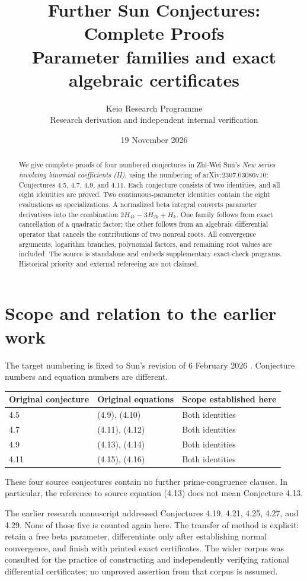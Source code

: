 \documentclass[11pt,a4paper]{article}
\title{Further Sun Conjectures: Complete Proofs\\[5pt]
\large Parameter families and exact algebraic certificates}
\author{Keio Research Programme\\Research derivation and independent internal verification}
\date{19 November 2026}
\theoremstyle{remark}\newtheorem{remark}[theorem]{Remark}
\numberwithin{equation}{section}
\begin{document}
\maketitle
\begin{abstract}
We give complete proofs of four numbered conjectures in Zhi-Wei Sun's
\emph{New series involving binomial coefficients (II)}, using the numbering
of arXiv:2307.03086v10: Conjectures 4.5, 4.7, 4.9, and 4.11.
Each conjecture consists of two identities, and all eight identities are
proved. Two continuous-parameter identities contain the eight evaluations
as specializations. A normalized beta integral converts parameter
derivatives into the combination $2H_{4k}-3H_{2k}+H_k$.
One family follows from exact cancellation of a quadratic factor;
the other follows from an algebraic differential operator that cancels
the contributions of two nonreal roots. All convergence arguments,
logarithm branches, polynomial factors, and remaining root values are
included. The source is standalone and embeds supplementary exact-check
programs. Historical priority and external refereeing are not claimed.
\end{abstract}

\section*{Scope and relation to the earlier work}
The target numbering is fixed to Sun's revision of 6 February 2026
\cite{Sun}. Conjecture numbers and equation numbers are different.
\begin{center}
\begin{tabular}{@{}lll@{}}\toprule
Original conjecture & Original equations & Scope established here\\\midrule
4.5 &(4.9), (4.10) &Both identities\\
4.7 &(4.11), (4.12) &Both identities\\
4.9 &(4.13), (4.14) &Both identities\\
4.11 &(4.15), (4.16) &Both identities\\\bottomrule
\end{tabular}
\end{center}
These four source conjectures contain no further prime-congruence clauses.
In particular, the reference to source equation (4.13) does not mean
Conjecture 4.13.

The earlier research manuscript addressed Conjectures 4.19, 4.21, 4.25,
4.27, and 4.29. None of those five is counted again here. The transfer of
method is explicit: retain a free beta parameter, differentiate only after
establishing normal convergence, and finish with printed exact
certificates. The wider corpus was consulted for the practice of
constructing and independently verifying rational differential
certificates; no unproved assertion from that corpus is assumed.
\end{document}
